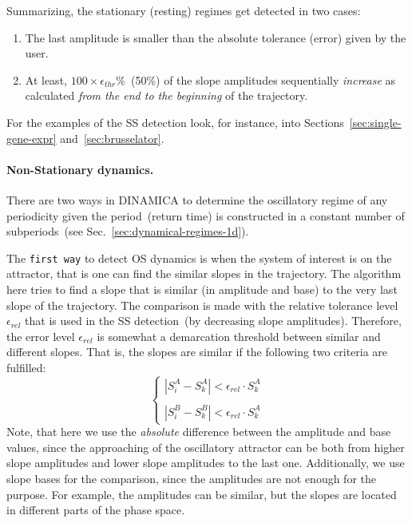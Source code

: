 \documentclass[11pt,a4paper]{article}
\begin{document}
Summarizing, the stationary (resting) regimes get detected in two cases:
\begin{enumerate}
\item The last amplitude is smaller than the absolute tolerance (error) given by the user.
\item At least, $100\times\epsilon_{thr}$\%~(50\%) of the slope amplitudes
  sequentially \textit{increase} as calculated \textit{from the end to the beginning}
  of the trajectory.
\end{enumerate}

For the examples of the SS detection look, for instance, into
Sections~\ref{sec:single-gene-expr} and~\ref{sec:brusselator}.

\paragraph{Non-Stationary dynamics.}

There are two ways in DINAMICA to determine the oscillatory regime of any periodicity
given the period~(return time) is constructed in a constant number of subperiods~(see
Sec.~\ref{sec:dynamical-regimes-1d}).

The \texttt{first way} to detect OS dynamics is when the system of interest is on the
attractor, that is one can find the similar slopes in the trajectory. The algorithm
here tries to find a slope that is similar (in amplitude and base) to the very last
slope of the trajectory. The comparison is made with the relative tolerance level
$\epsilon_{rel}$ that is used in the SS detection~(by decreasing slope
amplitudes). Therefore, the error level $\epsilon_{rel}$ is somewhat a demarcation
threshold between similar and different slopes. That is, the slopes are similar if
the following two criteria are fulfilled:
\begin{equation}
  \label{eq:os_similar_slopes_criteria}
  \left \{
  \begin{matrix}
    \left| S^A_i - S^A_k\right| < \epsilon_{rel}\cdot S^A_k \\
    \\
    \left| S^B_i - S^B_k\right| < \epsilon_{rel}\cdot S^A_k
  \end{matrix}
  \right.
\end{equation}
Note, that here we use the \textit{absolute} difference between the amplitude and
base values, since the approaching of the oscillatory attractor can be both from
higher slope amplitudes and lower slope amplitudes to the last one. Additionally, we
use slope bases for the comparison, since the amplitudes are not enough for the
purpose. For example, the amplitudes can be similar, but the slopes are located in
different parts of the phase space.
\end{document}
